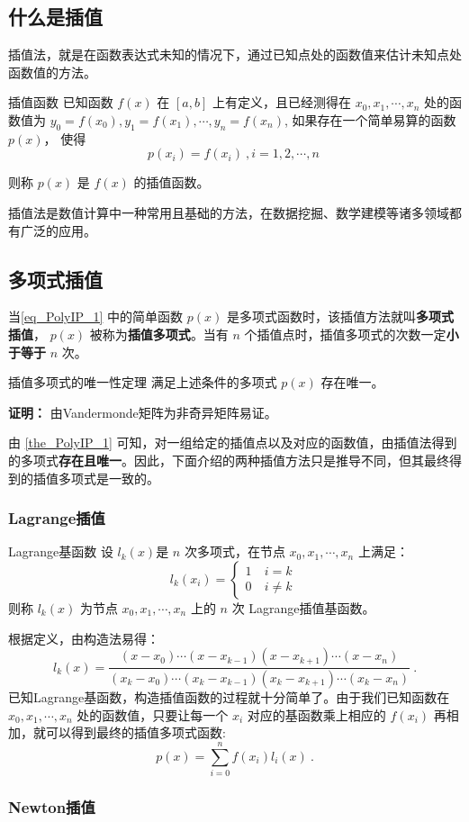 \subsection{什么是插值}
插值法，就是在函数表达式未知的情况下，通过已知点处的函数值来估计未知点处函数值的方法。\begin{definition}{插值函数}
已知函数 $f(x)$ 在 $\left[a,b\right] $ 上有定义，且已经测得在 $x_0,x_1,\cdots, x_n$ 处的函数值为 $y_0 = f(x_0),y_1 = f(x_1), \cdots, y_n = f(x_n)$, 如果存在一个简单易算的函数 $p(x)$， 使得\begin{equation}
\label{eq_PolyIP_1}
p(x_i) = f(x_i)~, i = 1,2, \cdots, n~
\end{equation}

则称 $p(x)$ 是 $f(x)$ 的插值函数。
\end{definition}

插值法是数值计算中一种常用且基础的方法，在数据挖掘、数学建模等诸多领域都有广泛的应用。

\subsection{多项式插值}
当\autoref{eq_PolyIP_1} 中的简单函数 $p(x)$ 是多项式函数时，该插值方法就叫\textbf{多项式插值}， $p(x)$ 被称为\textbf{插值多项式}。当有 $n$ 个插值点时，插值多项式的次数一定\textbf{小于等于} $n$ 次。
\begin{theorem}{插值多项式的唯一性定理}\label{the_PolyIP_1}
满足上述条件的多项式 $p(x)$ 存在唯一。

\end{theorem}
\textbf{证明：} 由Vandermonde矩阵为非奇异矩阵易证。

由 \autoref{the_PolyIP_1} 可知，对一组给定的插值点以及对应的函数值，由插值法得到的多项式\textbf{存在且唯一}。因此，下面介绍的两种插值方法只是推导不同，但其最终得到的插值多项式是一致的。
\subsubsection{Lagrange插值}
\begin{definition}{Lagrange基函数}
设 $l_k(x)$是 $n$ 次多项式，在节点 $x_0, x_1,\cdots,x_n$ 上满足：
\begin{equation}
l_k(x_i) = 
\begin{cases}
1\ &i = k\\
0 \ &i \neq k
\end{cases}~
\end{equation}
则称 $l_k(x)$ 为节点 $x_0,x_1,\cdots,x_n$ 上的 $n$ 次 Lagrange插值基函数。
\end{definition}
根据定义，由构造法易得：
\begin{equation}
l_k(x) = \frac{(x-x_0)\cdots(x-x_{k-1})(x-x_{k+1})\cdots (x-x_n)}{(x_k-x_0)\cdots(x_k-x_{k-1})(x_k-x_{k+1})\cdots(x_k-x_n)}~.
\end{equation}
已知Lagrange基函数，构造插值函数的过程就十分简单了。由于我们已知函数在 $x_0,x_1,\cdots,x_n$ 处的函数值，只要让每一个 $x_i$ 对应的基函数乘上相应的 $f(x_i)$ 再相加，就可以得到最终的插值多项式函数:
\begin{equation}
p(x) = \sum_{i = 0}^n f(x_i)l_i(x) ~.
\end{equation}

\subsubsection{Newton插值}


